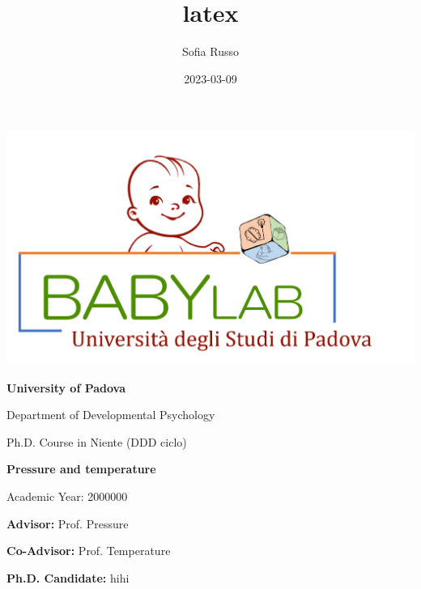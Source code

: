 \documentclass[
]{article}
\title{latex}
\author{Sofia Russo}
\date{2023-03-09}
\begin{document}
\maketitle


	\begin{center}
		\includegraphics[width=0.25\linewidth]{images/LOGO.png}
	\end{center}
	
	\begin{center}
		\begin{Large}
			\textbf{University of Padova}
			
			Department of Developmental Psychology
		\end{Large}
		
	\end{center}
	
	\vspace{3mm}
	\begin{center}
		\begin{large}
			Ph.D. Course in Niente (DDD ciclo)
		\end{large}
		
		\begin{huge}
			\bfseries
			Pressure and temperature
		\end{huge}
		
		
	\end{center}
	
	
	\begin{center}
		Academic Year: 2000000
	\end{center}
	


\vspace{2cm}
	\begin{multicols}{2}
		\begin{flushleft}
				\textbf{Advisor:} Prof. Pressure
				
				\textbf{Co-Advisor:} Prof. Temperature
			
		\end{flushleft}
		\columnbreak
		\begin{flushright}
			\vspace{1.5cm}
			
				\textbf{Ph.D. Candidate:} hihi 
			
		\end{flushright}
		
	\end{multicols}
\end{document}
